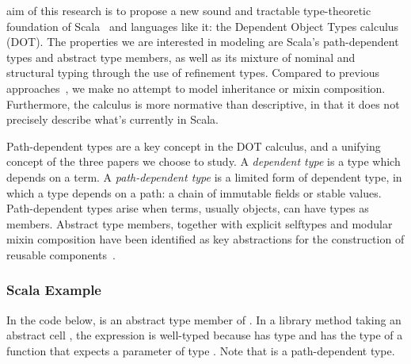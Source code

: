 \documentclass[10pt,journal,a4paper]{IEEEtran}
\begin{document}

 aim of this research is to propose a new sound
and tractable type-theoretic foundation of Scala~\cite{ScalaOverview} and languages like
it: the Dependent Object Types calculus (DOT). The properties we are
interested in modeling are Scala's path-dependent types and abstract
type members, as well as its mixture of nominal and structural typing
through the use of refinement types. Compared to previous
approaches~\cite{nuObj,FS}, we make no attempt to model inheritance or
mixin composition. Furthermore, the calculus is more normative than
descriptive, in that it does not precisely describe what's currently
in Scala.

Path-dependent types are a key concept in the DOT calculus, and a
unifying concept of the three papers we choose to study. A {\it
  dependent type} is a type which depends on a term. A {\it
  path-dependent type} is a limited form of dependent type, in which a
type depends on a path: a chain of immutable fields or
stable values. Path-dependent types arise when terms, usually objects, can
have types as members. Abstract type members, together with explicit
selftypes and modular mixin composition have been identified as key
abstractions for the construction of reusable components~\cite{SCA}.

\subsubsection*{Scala Example} In the code below,
 is an abstract type member of . In a
library method taking an abstract cell , the expression
 is well-typed because  has type
 and  has the type of a function that expects a
parameter of type . Note that  is a path-dependent
type. 


\end{document}
